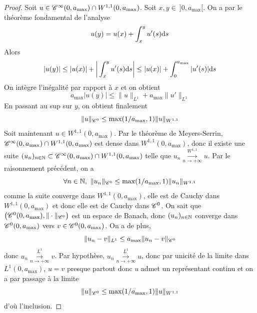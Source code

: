 \begin{proof}
    Soit $u \in \mathscr{C}^{\infty}(0,a_{\max})\cap W^{1,1}(0,a_{\max})$. Soit $x,y \in \ ]0,a_{\max}[$. On a par le théorème fondamental de l'analyse
    \begin{equation*}
        u(y) = u(x) + \int_x^y u'(s)\mathrm{d} s
    \end{equation*}
    Alors 
    \begin{equation*}
        |u(y)| \leq |u(x)| + \bigg|\int_x^yu'(s)\mathrm{d} s\bigg| \leq |u(x)| + \int_0^{a_{\max}}|u'(s)|\mathrm{d} s
    \end{equation*}
    On intègre l'inégalité par rapport à $x$ et on obtient 
    \begin{equation*}
        a_{\max}|u(y)| \leq \|u\|_{L^1} + a_{\max}\|u'\|_{L^1}
    \end{equation*}
    En passant au sup sur $y$, on obtient finalement 
    \begin{equation*}
        \|u\|_{\mathscr{C}^0} \leq \max(1/a_{\max},1)\|u\|_{W^{1,1}}
    \end{equation*}
    Soit maintenant $u \in W^{1,1}(0,a_{\max})$. Par le théorème de Meyers-Serrin, $\mathscr{C}^{\infty}(0,a_{\max})\cap W^{1,1}(0,a_{\max})$ est dense dans $W^{1,1}(0,a_{\max})$, donc il existe une suite $(u_n)_{n \in \mathbb{N}} \subset \mathscr{C}^{\infty}(0,a_{\max})\cap W^{1,1}(0,a_{\max})$ telle que $u_n \overset{W^{1,1}}{\underset{n \to +\infty}{\longrightarrow}} u$. Par le raisonnement précédent, on a 
    \begin{equation*}
        \forall n \in \mathbb{N}, \ \|u_n\|_{\mathscr{C}^0} \leq \max(1/a_{\max},1)\|u_n\|_{W^{1,1}}
    \end{equation*}
    comme la suite converge dans $W^{1,1}(0,a_{\max})$, elle est de Cauchy dans $W^{1,1}(0,a_{\max})$ et donc elle est de Cauchy dans $\mathscr{C}^0$. On sait que $\big(\mathscr{C}^0(0,a_{\max}),\|\cdot\|_{\mathscr{C}^0}\big)$ est un espace de Banach, donc $(u_n)_{n \in \mathbb{N}}$ converge dans $\mathscr{C}^0(0,a_{\max})$ vers $v \in \mathscr{C}^0(0,a_{\max})$. On a de plus,
    \begin{equation*}
        \|u_n-v\|_{L^1} \leq a_{\max}\|u_n-v\|_{\mathscr{C}^0}
    \end{equation*}
    donc $u_n \overset{L^{1}}{\underset{n \to +\infty}{\longrightarrow}} v$. Par hypothèse, $u_n \overset{L^{1}}{\underset{n \to +\infty}{\longrightarrow}} u$, donc par unicité de la limite dans $L^1(0,a_{\max})$, $u=v$ presque partout donc $u$ admet un représentant continu et on a par passage à la limite 
    \begin{equation*}
        \|u\|_{\mathscr{C}^0} \leq \max(1/a_{\max},1)\|u\|_{W^{1,1}}
    \end{equation*}
    d'où l'inclusion.
\end{proof}

